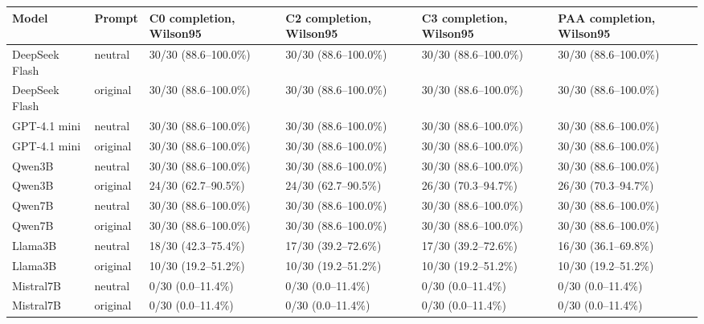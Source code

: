 \begin{tabular}{llllll}
\hline
Model & Prompt & C0 completion, Wilson95 & C2 completion, Wilson95 & C3 completion, Wilson95 & PAA completion, Wilson95 \\
\hline
DeepSeek Flash & neutral & 30/30 (88.6--100.0\%) & 30/30 (88.6--100.0\%) & 30/30 (88.6--100.0\%) & 30/30 (88.6--100.0\%) \\
DeepSeek Flash & original & 30/30 (88.6--100.0\%) & 30/30 (88.6--100.0\%) & 30/30 (88.6--100.0\%) & 30/30 (88.6--100.0\%) \\
GPT-4.1 mini & neutral & 30/30 (88.6--100.0\%) & 30/30 (88.6--100.0\%) & 30/30 (88.6--100.0\%) & 30/30 (88.6--100.0\%) \\
GPT-4.1 mini & original & 30/30 (88.6--100.0\%) & 30/30 (88.6--100.0\%) & 30/30 (88.6--100.0\%) & 30/30 (88.6--100.0\%) \\
Qwen3B & neutral & 30/30 (88.6--100.0\%) & 30/30 (88.6--100.0\%) & 30/30 (88.6--100.0\%) & 30/30 (88.6--100.0\%) \\
Qwen3B & original & 24/30 (62.7--90.5\%) & 24/30 (62.7--90.5\%) & 26/30 (70.3--94.7\%) & 26/30 (70.3--94.7\%) \\
Qwen7B & neutral & 30/30 (88.6--100.0\%) & 30/30 (88.6--100.0\%) & 30/30 (88.6--100.0\%) & 30/30 (88.6--100.0\%) \\
Qwen7B & original & 30/30 (88.6--100.0\%) & 30/30 (88.6--100.0\%) & 30/30 (88.6--100.0\%) & 30/30 (88.6--100.0\%) \\
Llama3B & neutral & 18/30 (42.3--75.4\%) & 17/30 (39.2--72.6\%) & 17/30 (39.2--72.6\%) & 16/30 (36.1--69.8\%) \\
Llama3B & original & 10/30 (19.2--51.2\%) & 10/30 (19.2--51.2\%) & 10/30 (19.2--51.2\%) & 10/30 (19.2--51.2\%) \\
Mistral7B & neutral & 0/30 (0.0--11.4\%) & 0/30 (0.0--11.4\%) & 0/30 (0.0--11.4\%) & 0/30 (0.0--11.4\%) \\
Mistral7B & original & 0/30 (0.0--11.4\%) & 0/30 (0.0--11.4\%) & 0/30 (0.0--11.4\%) & 0/30 (0.0--11.4\%) \\
\hline
\end{tabular}
